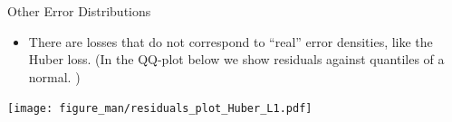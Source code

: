 \begin{vbframe}{Other Error Distributions}

\begin{itemize}
\item There are losses that do not correspond to \enquote{real} error densities, like the Huber loss. (In the QQ-plot below we show residuals against quantiles of a normal. )
\end{itemize}

\begin{center}
\texttt{[image: figure\_man/residuals\_plot\_Huber\_L1.pdf]}
\end{center}




\end{vbframe}



